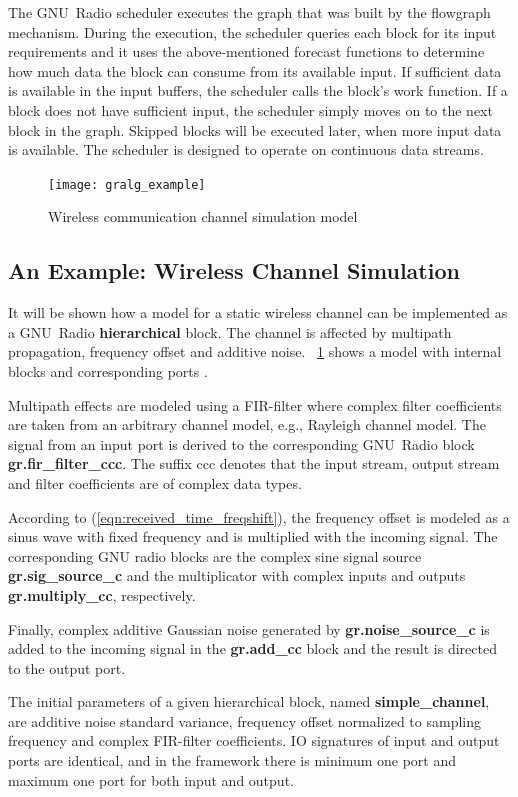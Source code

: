 The GNU~Radio scheduler executes the graph that was built by the flowgraph mechanism. During the execution, the scheduler queries each block for its input requirements and it uses the above-mentioned forecast functions to determine how much data the block can consume from its available input. If sufficient data is available in the input buffers, the scheduler calls the block's work function. If a block does not have sufficient input, the scheduler simply moves on to the next block in the graph. Skipped blocks will be executed later, when more input data is available. The scheduler is designed to operate on continuous data streams.
%
\begin{figure}[thb]
\centering
\texttt{[image: gralg\_example]}
\caption{Wireless communication channel simulation model}\label{fig:gralg_example}
\end{figure}

\subsection{An Example: Wireless Channel Simulation}

It will be shown how a model for a static wireless channel can be implemented as a GNU~Radio \textbf{hierarchical} block. The channel is affected by multipath propagation, frequency offset and additive noise. ~\cref{fig:gralg_example} shows a model with internal blocks and corresponding ports \cite{Auras}.

Multipath effects are modeled using a FIR-filter where complex filter coefficients are taken from an arbitrary channel model, e.g., Rayleigh channel model. The signal from an input port is derived to the corresponding GNU~Radio block \textbf{gr.fir\_filter\_ccc}. The suffix ccc denotes that the input stream, output stream and filter coefficients are of complex data types.

According to (\ref{eqn:received_time_freqshift}), the frequency offset is modeled as a sinus wave with fixed frequency and is multiplied with the incoming signal. The corresponding GNU radio blocks are the complex sine signal source \textbf{gr.sig\_source\_c} and the multiplicator with complex inputs and outputs \textbf{gr.multiply\_cc}, respectively.

Finally, complex additive Gaussian noise generated by \textbf{gr.noise\_source\_c} is added to the incoming signal in the \textbf{gr.add\_cc} block and the result is directed to the output port.

The initial parameters of a given hierarchical block, named \textbf{simple\_channel}, are additive noise standard variance, frequency offset normalized to sampling frequency and complex FIR-filter coefficients. IO signatures of input and output ports are identical, and in the framework there is minimum one port and maximum one port for both input and output.


